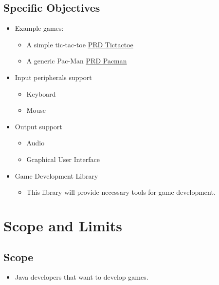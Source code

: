 \documentclass{article}
\begin{document}
\subsection{Specific Objectives}
\begin{itemize}
    \item Example games:
    \begin{itemize}
        \item A simple tic-tac-toe \href{https://docs.google.com/document/d/1MvlmgCBZvRrT61A3mnra-3bZ41zCcE_vmNHpHkZyQ2M/edit}{PRD Tictactoe}
        \item A generic Pac-Man \href{https://docs.google.com/document/d/1ST29Ap_2OGVEf--gPTfHYmAZrcIQC6jl6y32fM3UQWo/edit}{PRD Pacman}
    \end{itemize}
    \item Input peripherals support
    \begin{itemize}
        \item Keyboard
        \item Mouse
    \end{itemize}
    \item Output support
    \begin{itemize}
        \item Audio
        \item Graphical User Interface
    \end{itemize}
    \item Game Development Library
    \begin{itemize}
        \item This library will provide necessary tools for game development.
    \end{itemize}
\end{itemize}

\section{Scope and Limits}

\subsection{Scope}
\begin{itemize}
    \item Java developers that want to develop games.
\end{itemize}
\end{document}
